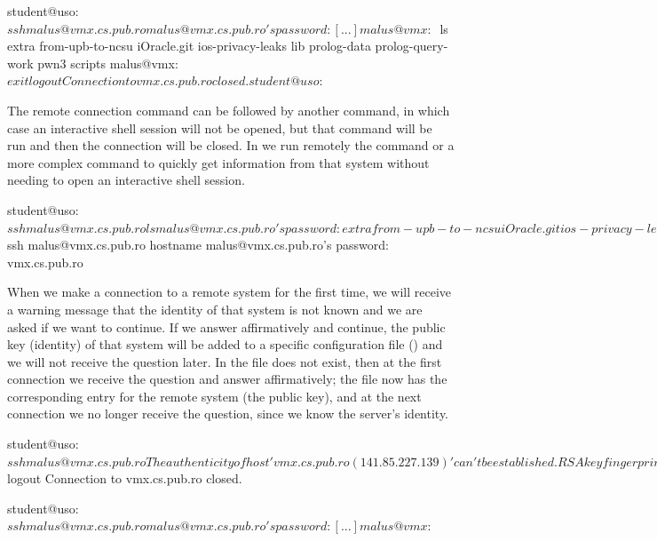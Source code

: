 \begin{screen}[caption={Remote shell access using SSH},label={lst:sec:ssh-shell}]
student@uso:~$ ssh malus@vmx.cs.pub.ro
malus@vmx.cs.pub.ro's password:
[...]
malus@vmx:~$ ls
extra  from-upb-to-ncsu  iOracle.git  ios-privacy-leaks  lib  prolog-data  prolog-query-work  pwn3  scripts
malus@vmx:~$ exit
logout
Connection to vmx.cs.pub.ro closed.
student@uso:~$
\end{screen}

The remote connection command can be followed by another command, in which case an interactive shell session will not be opened, but that command will be run and then the connection will be closed.
In  we run remotely the  command or a more complex command to quickly get information from that system without needing to open an interactive shell session.

\begin{screen}[caption={Running remote commands through SSH},label={lst:sec:ssh-commands}]
student@uso:~$ ssh malus@vmx.cs.pub.ro ls
malus@vmx.cs.pub.ro's password:
extra
from-upb-to-ncsu
iOracle.git
ios-privacy-leaks
lib
prolog-data
prolog-query-work
pwn3
scripts
student@uso:~$ ssh malus@vmx.cs.pub.ro hostname
malus@vmx.cs.pub.ro's password:
vmx.cs.pub.ro
\end{screen}

When we make a connection to a remote system for the first time, we will receive a warning message that the identity of that system is not known and we are asked if we want to continue.
If we answer affirmatively and continue, the public key (identity) of that system will be added to a specific configuration file () and we will not receive the question later.
In  the file  does not exist, then at the first connection we receive the question and answer affirmatively;
the file  now has the corresponding entry for the remote system (the public key), and at the next connection we no longer receive the question, since we know the server's identity.

\begin{screen}[caption={Verifying server identity through SSH},label={lst:sec:ssh-host-check}]
student@uso:~$ ssh malus@vmx.cs.pub.ro
The authenticity of host 'vmx.cs.pub.ro (141.85.227.139)' can't be established.
RSA key fingerprint is SHA256:CrRMD7nrflw7/KEZ4z7lksvEd8tXxkjuVXoBqsG5Vdc.
Are you sure you want to continue connecting (yes/no)? yes
Warning: Permanently added 'vmx.cs.pub.ro,141.85.227.139' (RSA) to the list of known hosts.
malus@vmx.cs.pub.ro's password:
[...]
malus@vmx:~$ logout
Connection to vmx.cs.pub.ro closed.

student@uso:~$ ssh malus@vmx.cs.pub.ro
malus@vmx.cs.pub.ro's password:
[...]
malus@vmx:~$
\end{screen}


